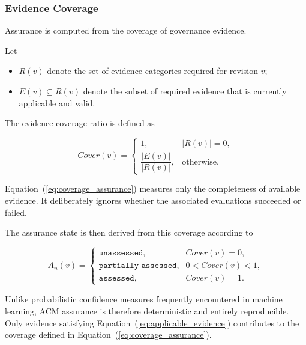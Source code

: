 \documentclass[10pt]{article}
\begin{document}
\subsubsection{Evidence Coverage}
\label{appendix:evidence_coverage}
Assurance is computed from the coverage of governance evidence.

Let

\begin{itemize}
	\item \(R(v)\) denote the set of evidence categories required for revision
	\(v\);
	\item \(E(v)\subseteq R(v)\) denote the subset of required evidence that is
	currently applicable and valid.
\end{itemize}

The evidence coverage ratio is defined as

\begin{equation}
	Cover(v)
	=
	\begin{cases}
		1,
		&
		|R(v)|=0,
		\\[0.3em]
		\dfrac{|E(v)|}{|R(v)|},
		&
		\text{otherwise.}
	\end{cases}
	\label{eq:coverage_assurance}
\end{equation}

Equation~(\ref{eq:coverage_assurance}) measures only the completeness of available
evidence. It deliberately ignores whether the associated evaluations succeeded
or failed.

The assurance state is then derived from this coverage according to

\begin{equation}
	A_n(v)
	=
	\begin{cases}
		\texttt{unassessed},
		&
		Cover(v)=0,
		\\[0.3em]
		\texttt{partially\_assessed},
		&
		0<Cover(v)<1,
		\\[0.3em]
		\texttt{assessed},
		&
		Cover(v)=1.
	\end{cases}
	\label{eq:assurance_from_coverage}
\end{equation}

Unlike probabilistic confidence measures frequently encountered in machine
learning, ACM assurance is therefore deterministic and entirely reproducible.
Only evidence satisfying Equation~(\ref{eq:applicable_evidence}) contributes to the
coverage defined in Equation~(\ref{eq:coverage_assurance}).

\end{document}
